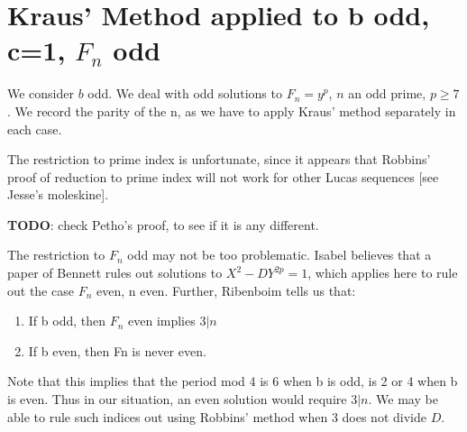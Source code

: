 \documentclass[12pt]{article}
\begin{document}
\section{Kraus' Method applied to b odd, c=1, $F_n$ odd}
We consider $b$ odd.
We deal with odd solutions to $F_n = y^p$, $n$ an odd prime, $p \geq 7$. We record the parity of the n, as we have to apply Kraus' method separately in each case.

The restriction to prime index is unfortunate, since it appears that Robbins' proof of reduction to prime index will not work for other Lucas sequences [see Jesse's moleskine]. 

\textbf{TODO}: check Petho's proof, to see if it is any different.

The restriction to $F_n$ odd may not be too problematic. Isabel believes that a paper of Bennett rules out solutions to $X^2-DY^{2p}=1$, which applies here to rule out the case $F_n$ even, n even. Further, Ribenboim tells us that:
\begin{enumerate}
\item If b odd, then $F_n$ even implies $3 | n$
\item If b even, then Fn is never even.
\end{enumerate}
Note that this implies that the period mod 4 is 6 when b is odd, is 2 or 4 when b is even. Thus in our situation, an even solution would require $3|n$. We may be able to rule such indices out using Robbins' method when 3 does not divide $D$.
\end{document}
